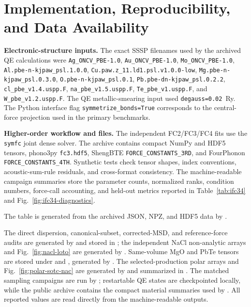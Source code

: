 \documentclass[aps,prb,reprint,amsmath,amssymb,floatfix]{revtex4-2}
\begin{document}
\color{revisionblue}
\section{Implementation, Reproducibility, and Data Availability}
\label{appendix-k-reproducibility}
\color{black}

\color{revisionblue}
\textbf{Electronic-structure inputs.} The exact SSSP filenames used by the
archived QE calculations were \texttt{Ag\_ONCV\_PBE-1.0},
\texttt{Au\_ONCV\_PBE-1.0}, \texttt{Mo\_ONCV\_PBE-1.0},
\texttt{Al.pbe-n-kjpaw\_psl.1.0.0},
\texttt{Cu.paw.z\_11.ld1.psl.v1.0.0-low},
\texttt{Mg.pbe-n-kjpaw\_psl.0.3.0},
\texttt{O.pbe-n-kjpaw\_psl.0.1},
\texttt{Pb.pbe-dn-kjpaw\_psl.0.2.2},
\texttt{cl\_pbe\_v1.4.uspp.F}, \texttt{na\_pbe\_v1.5.uspp.F},
\texttt{Te\_pbe\_v1.uspp.F}, and \texttt{W\_pbe\_v1.2.uspp.F}. The QE
metallic-smearing input used \texttt{degauss=0.02}~Ry. The Python interface flag
\texttt{symmetrize\_bonds=True} corresponds to the central-force projection
used in the primary benchmarks.
\color{black}

\color{revisionblue}
\textbf{Higher-order workflow and files.} The independent FC2/FC3/FC4 fits use
the \texttt{symfc} joint dense solver. The archive contains compact NumPy and
HDF5 tensors, phono3py \texttt{fc3.hdf5}, ShengBTE
\texttt{FORCE\_CONSTANTS\_3RD}, and FourPhonon
\texttt{FORCE\_CONSTANTS\_4TH}. Synthetic tests check tensor shapes, index
conventions, acoustic-sum-rule residuals, and cross-format consistency. The
machine-readable campaign summaries store the parameter counts, normalized
ranks, condition numbers, force-call accounting, and held-out metrics reported
in Table~\ref{tab:ifc34} and Fig.~\ref{fig:ifc34-diagnostics}.
\color{black}

\color{revisionblue}
The table is generated from the archived JSON, NPZ, and HDF5 data by
.
\color{black}

\color{revisionblue}
The direct dispersion, canonical-subset, corrected-MSD, and reference-force
audits are generated by 
and stored in ;
the independent NaCl non-analytic arrays and Fig.~\ref{fig:nacl-loto} are
generated by .
Same-volume MgO and PbTe tensors are stored under
 and
, generated by
.
The selected-production polar arrays and Fig.~\ref{fig:polar-sotc-nac} are
generated by  and summarized in
.
The matched sampling campaigns are run by
; restartable QE states
are checkpointed locally, while the public archive contains the compact
material summaries used by
.
All reported values are read directly from the machine-readable outputs.
\color{black}
\end{document}
